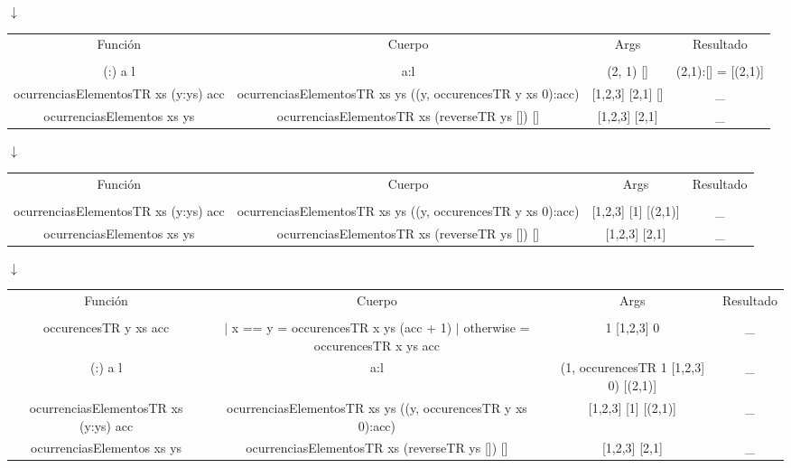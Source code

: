 \begin{enumerate}
{\begin{itemize}
{\begin{center}
                $\downarrow$
                
                \begin{NiceTabular}{|c c c c|}
                    Función & Cuerpo & Args & Resultado \\
                    &&&\\
                    (:) a l & a:l & (2, 1) [] & (2,1):[] = [(2,1)] \\ \hline
                    ocurrenciasElementosTR xs (y:ys) acc & ocurrenciasElementosTR xs ys ((y, occurencesTR y xs 0):acc) & [1,2,3] [2,1] [] & \_ \\ \hline
                    ocurrenciasElementos xs ys & ocurrenciasElementosTR xs (reverseTR ys []) [] & [1,2,3] [2,1] & \_ \\ \hline
                \end{NiceTabular} %

                $\downarrow$
                
                \begin{NiceTabular}{|c c c c|}
                    Función & Cuerpo & Args & Resultado \\
                    &&&\\
                    ocurrenciasElementosTR xs (y:ys) acc & ocurrenciasElementosTR xs ys ((y, occurencesTR y xs 0):acc) & [1,2,3] [1] [(2,1)] & \_ \\ \hline
                    ocurrenciasElementos xs ys & ocurrenciasElementosTR xs (reverseTR ys []) [] & [1,2,3] [2,1] & \_ \\ \hline
                \end{NiceTabular}

                $\downarrow$
                
                \begin{NiceTabular}{|c c c c|}
                    Función & Cuerpo & Args & Resultado \\
                    &&&\\
                    occurencesTR y xs acc & $|$ x == y = occurencesTR x ys (acc + 1) $|$ otherwise = occurencesTR x ys acc & 1 [1,2,3] 0 & \_ \\ \hline
                    (:) a l & a:l & (1, occurencesTR 1 [1,2,3] 0) [(2,1)] & \_ \\ \hline
                    ocurrenciasElementosTR xs (y:ys) acc & ocurrenciasElementosTR xs ys ((y, occurencesTR y xs 0):acc) & [1,2,3] [1] [(2,1)] & \_ \\ \hline
                    ocurrenciasElementos xs ys & ocurrenciasElementosTR xs (reverseTR ys []) [] & [1,2,3] [2,1] & \_ \\ \hline
                \end{NiceTabular}


\end{center}}
\end{itemize}}
\end{enumerate}
